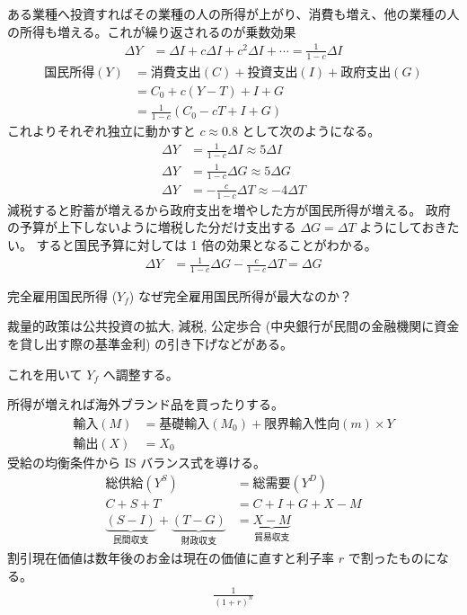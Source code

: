 \documentclass[uplatex,dvipdfmx,a4paper,11pt]{jlreq}
\numberwithin{equation}{section}
\theoremstyle{definition}
\begin{document}
ある業種へ投資すればその業種の人の所得が上がり、消費も増え、他の業種の人の所得も増える。これが繰り返されるのが乗数効果
\begin{align}
  \Delta Y & = \Delta I + c\Delta I + c^2\Delta I +\cdots = \frac{1}{1 - c}\Delta I
\end{align}
\begin{align}
  国民所得 (Y) & = 消費支出 (C) + 投資支出 (I) + 政府支出 (G)    \\
           & = C_0 + c(Y - T) + I + G            \\
           & = \frac{1}{1 - c}(C_0 - cT + I + G)
\end{align}
これよりそれぞれ独立に動かすと $c \approx 0.8$ として次のようになる。
\begin{align}
  \Delta Y & = \frac{1}{1 - c}\Delta I \approx 5\Delta I   \\
  \Delta Y & = \frac{1}{1 - c}\Delta G \approx 5\Delta G   \\
  \Delta Y & = -\frac{c}{1 - c}\Delta T \approx -4\Delta T
\end{align}
減税すると貯蓄が増えるから政府支出を増やした方が国民所得が増える。
政府の予算が上下しないように増税した分だけ支出する $\Delta G = \Delta T$ ようにしておきたい。
すると国民予算に対しては 1 倍の効果となることがわかる。
\begin{align}
  \Delta Y & = \frac{1}{1 - c}\Delta G - \frac{c}{1 - c}\Delta T = \Delta G
\end{align}

完全雇用国民所得 ($Y_f$)
なぜ完全雇用国民所得が最大なのか？

裁量的政策は公共投資の拡大, 減税, 公定歩合 (中央銀行が民間の金融機関に資金を貸し出す際の基準金利) の引き下げなどがある。

これを用いて $Y_f$ へ調整する。

所得が増えれば海外ブランド品を買ったりする。
\begin{align}
  輸入 (M) & = 基礎輸入 (M_0) + 限界輸入性向 (m) \times Y \\
  輸出 (X) & = X_0
\end{align}
受給の均衡条件から IS バランス式を導ける。
\begin{align}
  総供給 (Y^S)                                                 & = 総需要 (Y^D)                 \\
  C + S + T                                                 & = C + I + G + X - M         \\
  \underbrace{(S - I)}_{民間収支} + \underbrace{(T - G)}_{財政収支} & = \underbrace{X - M}_{貿易収支}
\end{align}
割引現在価値は数年後のお金は現在の価値に直すと利子率 $r$ で割ったものになる。
\begin{align}
  \frac{1}{(1 + r)^n}
\end{align}
\end{document}
